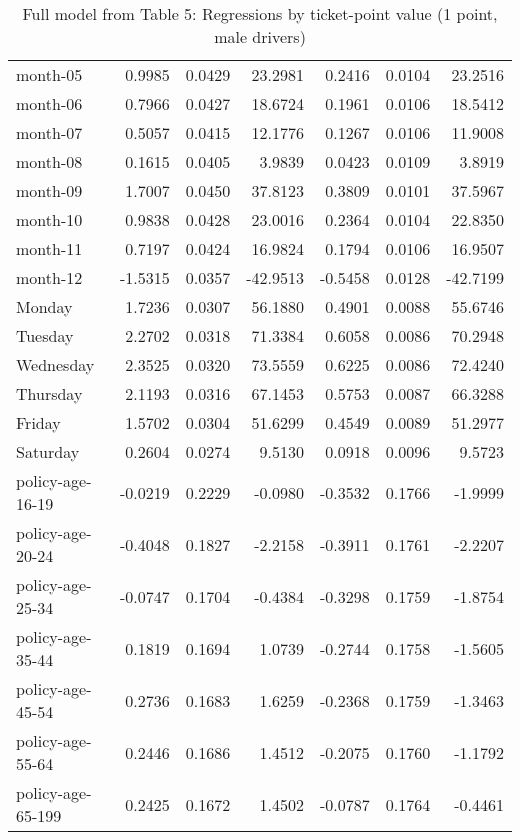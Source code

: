 \documentclass[10pt]{article}
\begin{document}
\begin{table}[ht]
\begin{tabular}{lrrrrrr}
  month-05 & 0.9985 & 0.0429 & 23.2981 & 0.2416 & 0.0104 & 23.2516 \\ 
  month-06 & 0.7966 & 0.0427 & 18.6724 & 0.1961 & 0.0106 & 18.5412 \\ 
  month-07 & 0.5057 & 0.0415 & 12.1776 & 0.1267 & 0.0106 & 11.9008 \\ 
  month-08 & 0.1615 & 0.0405 & 3.9839 & 0.0423 & 0.0109 & 3.8919 \\ 
  month-09 & 1.7007 & 0.0450 & 37.8123 & 0.3809 & 0.0101 & 37.5967 \\ 
  month-10 & 0.9838 & 0.0428 & 23.0016 & 0.2364 & 0.0104 & 22.8350 \\ 
  month-11 & 0.7197 & 0.0424 & 16.9824 & 0.1794 & 0.0106 & 16.9507 \\ 
  month-12 & -1.5315 & 0.0357 & -42.9513 & -0.5458 & 0.0128 & -42.7199 \\ 
  Monday & 1.7236 & 0.0307 & 56.1880 & 0.4901 & 0.0088 & 55.6746 \\ 
  Tuesday & 2.2702 & 0.0318 & 71.3384 & 0.6058 & 0.0086 & 70.2948 \\ 
  Wednesday & 2.3525 & 0.0320 & 73.5559 & 0.6225 & 0.0086 & 72.4240 \\ 
  Thursday & 2.1193 & 0.0316 & 67.1453 & 0.5753 & 0.0087 & 66.3288 \\ 
  Friday & 1.5702 & 0.0304 & 51.6299 & 0.4549 & 0.0089 & 51.2977 \\ 
  Saturday & 0.2604 & 0.0274 & 9.5130 & 0.0918 & 0.0096 & 9.5723 \\ 
  policy-age-16-19 & -0.0219 & 0.2229 & -0.0980 & -0.3532 & 0.1766 & -1.9999 \\ 
  policy-age-20-24 & -0.4048 & 0.1827 & -2.2158 & -0.3911 & 0.1761 & -2.2207 \\ 
  policy-age-25-34 & -0.0747 & 0.1704 & -0.4384 & -0.3298 & 0.1759 & -1.8754 \\ 
  policy-age-35-44 & 0.1819 & 0.1694 & 1.0739 & -0.2744 & 0.1758 & -1.5605 \\ 
  policy-age-45-54 & 0.2736 & 0.1683 & 1.6259 & -0.2368 & 0.1759 & -1.3463 \\ 
  policy-age-55-64 & 0.2446 & 0.1686 & 1.4512 & -0.2075 & 0.1760 & -1.1792 \\ 
  policy-age-65-199 & 0.2425 & 0.1672 & 1.4502 & -0.0787 & 0.1764 & -0.4461 \\ 
   \hline
\end{tabular}
\caption{Full model from Table 5: Regressions by ticket-point value (1 point, male drivers)} 
\label{tab_5_1_pts_M}
\end{table}
\end{document}
